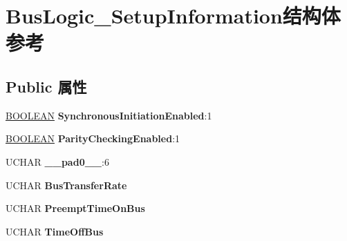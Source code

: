 \hypertarget{struct_bus_logic___setup_information}{}\section{Bus\+Logic\+\_\+\+Setup\+Information结构体 参考}
\label{struct_bus_logic___setup_information}
\subsection*{Public 属性}
\begin{DoxyCompactItemize}
\item 
\mbox{\label{struct_bus_logic___setup_information_aebf10e20d050b3dcc844be84dd6ac5ca}} 
\hyperlink{_processor_bind_8h_a112e3146cb38b6ee95e64d85842e380a}{B\+O\+O\+L\+E\+AN} {\bfseries Synchronous\+Initiation\+Enabled}\+:1
\item 
\mbox{\label{struct_bus_logic___setup_information_af67bb008e61a156a5d0a505d748ac400}} 
\hyperlink{_processor_bind_8h_a112e3146cb38b6ee95e64d85842e380a}{B\+O\+O\+L\+E\+AN} {\bfseries Parity\+Checking\+Enabled}\+:1
\item 
\mbox{\label{struct_bus_logic___setup_information_a28e6e27c4b56aa672b99981b564ac133}} 
U\+C\+H\+AR {\bfseries \+\_\+\+\_\+pad0\+\_\+\+\_\+}\+:6
\item 
\mbox{\label{struct_bus_logic___setup_information_a64b020f07ba64e455b9394d4074ef899}} 
U\+C\+H\+AR {\bfseries Bus\+Transfer\+Rate}
\item 
\mbox{\label{struct_bus_logic___setup_information_ae304b56dda0b79a2ddc7d95f340f7423}} 
U\+C\+H\+AR {\bfseries Preempt\+Time\+On\+Bus}
\item 
\mbox{\label{struct_bus_logic___setup_information_a432a894cb5579c4d20fa77ffac933f16}} 
U\+C\+H\+AR {\bfseries Time\+Off\+Bus}
\item 
\mbox{\label{struct_bus_logic___setup_information_a47cbaae526ce380075210069cf476ae9}} 

\end{DoxyCompactItemize}
